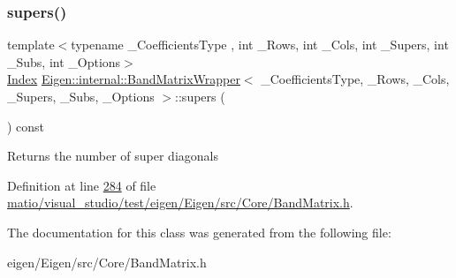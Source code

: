 \subsubsection{\texorpdfstring{supers()}{supers()}\hspace{0.1cm}{\footnotesize\ttfamily [2/2]}}
{\footnotesize\ttfamily template$<$typename \+\_\+\+Coefficients\+Type , int \+\_\+\+Rows, int \+\_\+\+Cols, int \+\_\+\+Supers, int \+\_\+\+Subs, int \+\_\+\+Options$>$ \\
\hyperlink{group___core___module_a554f30542cc2316add4b1ea0a492ff02}{Index} \hyperlink{class_eigen_1_1internal_1_1_band_matrix_wrapper}{Eigen\+::internal\+::\+Band\+Matrix\+Wrapper}$<$ \+\_\+\+Coefficients\+Type, \+\_\+\+Rows, \+\_\+\+Cols, \+\_\+\+Supers, \+\_\+\+Subs, \+\_\+\+Options $>$\+::supers (\begin{DoxyParamCaption}{ }\end{DoxyParamCaption}) const\hspace{0.3cm}{\ttfamily [inline]}}

\begin{DoxyReturn}{Returns}
the number of super diagonals 
\end{DoxyReturn}


Definition at line \hyperlink{matio_2visual__studio_2test_2eigen_2_eigen_2src_2_core_2_band_matrix_8h_source_l00284}{284} of file \hyperlink{matio_2visual__studio_2test_2eigen_2_eigen_2src_2_core_2_band_matrix_8h_source}{matio/visual\+\_\+studio/test/eigen/\+Eigen/src/\+Core/\+Band\+Matrix.\+h}.



The documentation for this class was generated from the following file\+:\begin{DoxyCompactItemize}
\item 
eigen/\+Eigen/src/\+Core/\+Band\+Matrix.\+h\end{DoxyCompactItemize}
